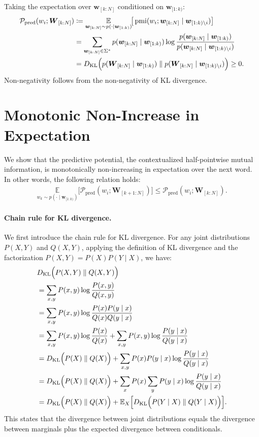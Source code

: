 \documentclass[11pt]{article}
\newcommand{\wseq}[2]{\ensuremath{\boldsymbol w_{[#1: #2]}}\xspace}
\newcommand{\Wseq}[2]{\ensuremath{\boldsymbol W_{[#1: #2]}}\xspace}
\newcommand{\curid}{\ensuremath{k}\xspace}
\newcommand{\sstartid}{\ensuremath{1}\xspace}
\newcommand{\sendid}{\ensuremath{N}\xspace}
\newcommand{\nextid}{\ensuremath{\curid+1}\xspace}
\newcommand{\targetid}{\ensuremath{i}\xspace}
\newcommand{\wcur}{\ensuremath{w_{\curid}}\xspace}
\newcommand{\wtarget}{\ensuremath{w_{\targetid}}\xspace}
\newcommand{\context}{\ensuremath{\boldsymbol w_{[\sstartid:\curid)}}\xspace}
\newcommand{\contextwotarget}{\ensuremath{\boldsymbol w_{[1:\curid)\setminus \targetid}}\xspace}
\newcommand{\future}{\ensuremath{\wseq{\curid}{\sendid}}\xspace}
\newcommand{\Future}{\ensuremath{\Wseq{\curid}{\sendid}}\xspace}
\newcommand{\FutureNext}{\ensuremath{\Wseq{\nextid}{\sendid}}\xspace}
\newcommand{\pmi}{\ensuremath{\operatorname{pmi}}\xspace}
\newcommand{\CHMI}{\ensuremath{\mathcal{P}_{\mathrm{pred}}}\xspace}
\newcommand{\chmi}[2]{\ensuremath{\CHMI(#1;#2)}\xspace}
\newcommand{\condprob}[2]{\ensuremath{p(#1\mid #2)}\xspace}
\newcommand{\condpmi}[3]{\ensuremath{\pmi(#1;#2\mid #3)}\xspace}
\newcommand{\condE}[3]{\ensuremath{\underset{#1\sim\condprob{\cdot}{#2}}{\mathbb{E}}\!\big[#3\big]}\xspace}
\newcommand{\E}[2]{\ensuremath{\mathbb{E}_{#1}\Big[#2\Big]}\xspace}
\newcommand{\KL}[2]{\ensuremath{D_{\operatorname{KL}}\Big(#1\parallel #2\Big)}\xspace}
\begin{document}
Taking the expectation over \future conditioned on \context:
\begin{align}
    \chmi{\wtarget}{\Future}
    &\coloneqq \condE{\future}{\context}{\condpmi{\wtarget}{\future}{\contextwotarget}} \notag\\
    &= \sum_{\future\in\Sigma^*} \condprob{\future}{\context} \log \frac{\condprob{\future}{\context}}{\condprob{\future}{\contextwotarget}} \notag\\
    &= \KL{\condprob{\Future}{\context}}{\condprob{\Future}{\contextwotarget}} \geq 0.
\end{align}
Non-negativity follows from the non-negativity of KL divergence.


\section{Monotonic Non-Increase in Expectation}
\label{app:mono}

We show that the predictive potential, the contextualized half-pointwise mutual information, is monotonically non-increasing in expectation over the next word.
In other words, the following relation holds:
\begin{align}
    \condE{\wcur}{\context}{\chmi{\wtarget}{\FutureNext}}\leq \chmi{\wtarget}{\Future}.
\end{align}


\paragraph{Chain rule for KL divergence.}
We first introduce the chain rule for KL divergence.
For any joint distributions $P(X, Y)$ and $Q(X, Y)$, applying the definition of KL divergence and the factorization $P(X, Y) = P(X)P(Y \mid X)$, we have:
\begin{align}
    &\KL{P(X, Y)}{Q(X, Y)} \notag\\
    &= \sum_{x, y} P(x, y) \log \frac{P(x, y)}{Q(x, y)} \notag\\
    &= \sum_{x, y} P(x, y) \log \frac{P(x) P(y \mid x)}{Q(x) Q(y \mid x)} \notag\\
    &= \sum_{x, y} P(x, y) \log \frac{P(x)}{Q(x)} + \sum_{x, y} P(x, y) \log \frac{P(y \mid x)}{Q(y \mid x)} \notag\\
    &= \KL{P(X)}{Q(X)} + \sum_{x, y} P(x) P(y \mid x) \log \frac{P(y \mid x)}{Q(y \mid x)} \notag\\
    &= \KL{P(X)}{Q(X)} + \sum_{x} P(x) \sum_{y} P(y \mid x) \log \frac{P(y \mid x)}{Q(y \mid x)} \notag\\
    &= \KL{P(X)}{Q(X)} + \E{X}{\KL{P(Y \mid X)}{Q(Y \mid X)}}.
    \label{eq:kl_chain}
\end{align}
This states that the divergence between joint distributions equals the divergence between marginals plus the expected divergence between conditionals.
\end{document}
